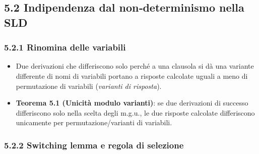\documentclass[12pt]{article}
\begin{document}
\subsection*{5.2 Indipendenza dal non‐determinismo nella SLD}

\subsubsection*{5.2.1 Rinomina delle variabili}

\begin{itemize}
  \item Due derivazioni che differiscono solo perché a una clausola si dà una variante differente di nomi di variabili portano a risposte calcolate uguali a meno di permutazione di variabili (\emph{varianti di risposta}).
  \item \textbf{Teorema 5.1 (Unicità modulo varianti)}: se due derivazioni di successo differiscono solo nella scelta degli m.g.u., le due risposte calcolate differiscono unicamente per permutazione/varianti di variabili.
\end{itemize}

\subsubsection*{5.2.2 Switching lemma e regola di selezione}
\end{document}
